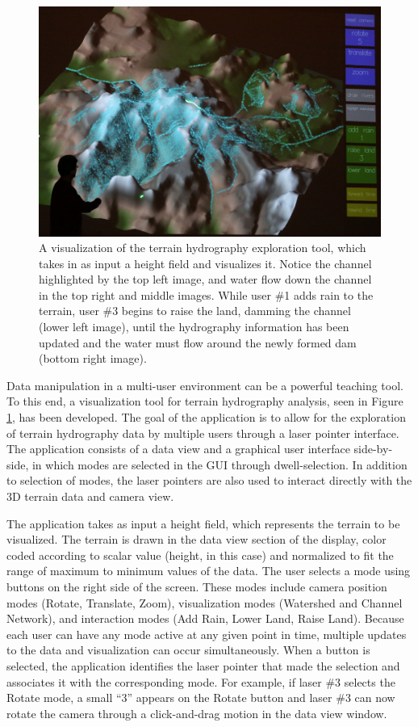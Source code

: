 \begin{figure}
\begin{center}
\begin{minipage}{0.79\linewidth}
    \includegraphics[width=0.49\linewidth]{images/terrain5.jpg}
  \end{minipage}  
  \end{center}
  \caption[Visualization of the terrain hydrography exploration tool]{\label{figure:hydrographyVisualization} A visualization of the terrain hydrography exploration tool, which takes in as input a height field and visualizes it. Notice the channel highlighted by the top left image, and water flow down the channel in the top right and middle images. While user \#1 adds rain to the terrain, user \#3 begins to raise the land, damming the channel (lower left image), until the hydrography information has been updated and the water must flow around the newly formed dam (bottom right image). }
\end{figure}


Data manipulation in a multi-user environment can be a powerful teaching tool. To this end, a visualization tool for terrain hydrography analysis, seen in Figure \ref{figure:hydrographyVisualization}, has been developed.
The goal of the application is to allow for the exploration of terrain hydrography data by multiple users through a laser pointer interface. The application consists of a data view and a graphical user interface side-by-side, in which modes are selected in the GUI through dwell-selection. In addition to selection of modes, the laser pointers are also used to interact directly with the 3D terrain data and camera view.

The application takes as input a height field,
which represents the terrain to be visualized. The terrain is drawn in the data view section of the display, color coded according to scalar value (height, in this case) and normalized to fit the range of maximum to minimum values of the data. The user selects a mode using buttons on the right side of the screen. These modes include camera position modes (Rotate, Translate, Zoom), visualization modes (Watershed and Channel Network), and interaction modes (Add Rain, Lower Land, Raise Land). Because each user can have any mode active at any given point in time, multiple updates to the data and visualization can occur simultaneously. When a button is selected, the application identifies the laser pointer that made the selection and associates it with the corresponding mode. For example, if laser \#3 selects the Rotate mode, a small ``3'' appears on the Rotate button and laser \#3 can now rotate the camera through a click-and-drag motion in the data view window.

